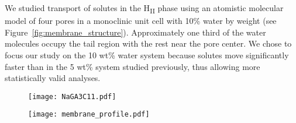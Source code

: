 \documentclass[journal=ancac3,manuscript=article,layout=twocolumn]{achemso}
\begin{document}
  We studied transport of solutes in the H\textsubscript{II} phase using an
  atomistic molecular model of four pores in a monoclinic unit cell with 10\%
  water by weight (see Figure~\ref{fig:membrane_structure}). Approximately one
  third of the water molecules occupy the tail region with the rest near the
  pore center. We chose to focus our study on the 10 wt\% water system because
  solutes move significantly faster than in the 5 wt\% system studied
  previously, thus allowing more statistically valid analyses.
  
  \begin{figure*}
  \centering
  \begin{subfigure}{0.4\textwidth}
  \centering
  \vspace{1.1cm}
  \texttt{[image: NaGA3C11.pdf]}
  \vspace{0.6cm}
  \caption{}\label{fig:monomer_structure}
  \end{subfigure}
  \begin{subfigure}{0.5\textwidth}
  \centering
  \texttt{[image: membrane\_profile.pdf]}
  \caption{}\label{fig:membrane_profile}
  \end{subfigure}
  \caption{(a) The wedge-shaped liquid crystal monomer Na-GA3C11 will form the inverted
  hexagonal phase in the presence of water where the carboxylate head groups occupy the
  pore centers. (b) A cross-section of a periodically replicated atomistic unit cell 
  used for simulations in this study reveals the membrane's aqueous, hexagonally packed,
  straight and uniform sized pores. Water molecules (red and white spheres) present in 
  the tail region are omitted for clarity.}\label{fig:membrane_structure}
  \end{figure*}
  
  
\end{document}
